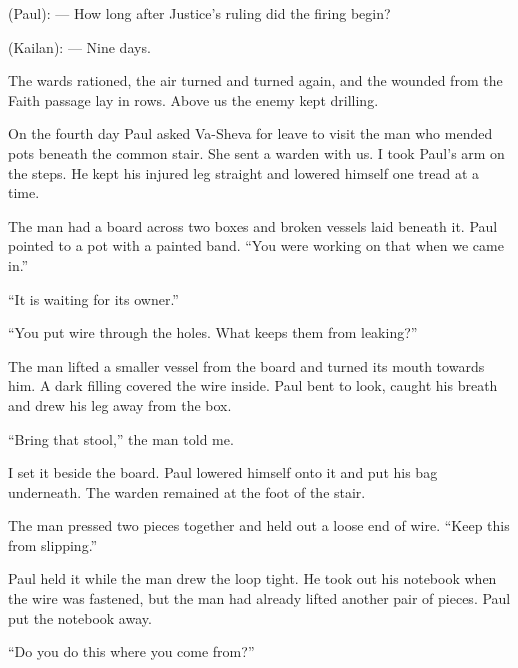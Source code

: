 
\begin{room}

(Paul): --- How long after Justice's ruling did the firing begin?

(Kailan): --- Nine days.

\end{room}

The wards rationed, the air turned and turned again, and the wounded from the Faith passage lay in rows. Above us the enemy kept drilling.\par

On the fourth day Paul asked Va-Sheva for leave to visit the man who mended pots beneath the common stair. She sent a warden with us. I took Paul's arm on the steps. He kept his injured leg straight and lowered himself one tread at a time.\par

The man had a board across two boxes and broken vessels laid beneath it. Paul pointed to a pot with a painted band. ``You were working on that when we came in.''\par

``It is waiting for its owner.''\par

``You put wire through the holes. What keeps them from leaking?''\par

The man lifted a smaller vessel from the board and turned its mouth towards him. A dark filling covered the wire inside. Paul bent to look, caught his breath and drew his leg away from the box.\par

``Bring that stool,'' the man told me.\par

I set it beside the board. Paul lowered himself onto it and put his bag underneath. The warden remained at the foot of the stair.\par

The man pressed two pieces together and held out a loose end of wire. ``Keep this from slipping.''\par

Paul held it while the man drew the loop tight. He took out his notebook when the wire was fastened, but the man had already lifted another pair of pieces. Paul put the notebook away.\par

``Do you do this where you come from?''\par

